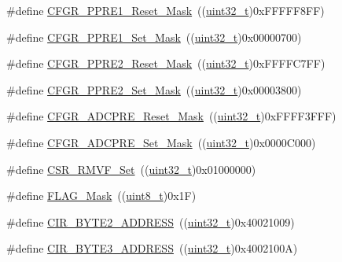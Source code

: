 \begin{DoxyCompactItemize}
\item 
\#define \hyperlink{group___r_c_c___private___defines_gab02d8032f451eb5a1d139007ff57f22e}{C\+F\+G\+R\+\_\+\+P\+P\+R\+E1\+\_\+\+Reset\+\_\+\+Mask}~((\hyperlink{_p_e___types_8h_a33594304e786b158f3fb30289278f5af}{uint32\+\_\+t})0x\+F\+F\+F\+F\+F8\+F\+F)
\item 
\#define \hyperlink{group___r_c_c___private___defines_ga74838e1873c5e4c46eef61a81b1bd2c5}{C\+F\+G\+R\+\_\+\+P\+P\+R\+E1\+\_\+\+Set\+\_\+\+Mask}~((\hyperlink{_p_e___types_8h_a33594304e786b158f3fb30289278f5af}{uint32\+\_\+t})0x00000700)
\item 
\#define \hyperlink{group___r_c_c___private___defines_gab2ee73d52f48cb201e493e381928d1ae}{C\+F\+G\+R\+\_\+\+P\+P\+R\+E2\+\_\+\+Reset\+\_\+\+Mask}~((\hyperlink{_p_e___types_8h_a33594304e786b158f3fb30289278f5af}{uint32\+\_\+t})0x\+F\+F\+F\+F\+C7\+F\+F)
\item 
\#define \hyperlink{group___r_c_c___private___defines_ga63883951c986cf6dc1d6a8775f821af7}{C\+F\+G\+R\+\_\+\+P\+P\+R\+E2\+\_\+\+Set\+\_\+\+Mask}~((\hyperlink{_p_e___types_8h_a33594304e786b158f3fb30289278f5af}{uint32\+\_\+t})0x00003800)
\item 
\#define \hyperlink{group___r_c_c___private___defines_ga12eb3f1b37b9101bf3810374bad68703}{C\+F\+G\+R\+\_\+\+A\+D\+C\+P\+R\+E\+\_\+\+Reset\+\_\+\+Mask}~((\hyperlink{_p_e___types_8h_a33594304e786b158f3fb30289278f5af}{uint32\+\_\+t})0x\+F\+F\+F\+F3\+F\+F\+F)
\item 
\#define \hyperlink{group___r_c_c___private___defines_gaead9b35ba6e98274613c28d24bd228cc}{C\+F\+G\+R\+\_\+\+A\+D\+C\+P\+R\+E\+\_\+\+Set\+\_\+\+Mask}~((\hyperlink{_p_e___types_8h_a33594304e786b158f3fb30289278f5af}{uint32\+\_\+t})0x0000\+C000)
\item 
\#define \hyperlink{group___r_c_c___private___defines_ga415e9d29487f0ef4101a9c6e4f20151f}{C\+S\+R\+\_\+\+R\+M\+V\+F\+\_\+\+Set}~((\hyperlink{_p_e___types_8h_a33594304e786b158f3fb30289278f5af}{uint32\+\_\+t})0x01000000)
\item 
\#define \hyperlink{group___r_c_c___private___defines_ga2be62bf481cd44de9ab604efe5595ff6}{F\+L\+A\+G\+\_\+\+Mask}~((\hyperlink{_p_e___types_8h_aba7bc1797add20fe3efdf37ced1182c5}{uint8\+\_\+t})0x1\+F)
\item 
\#define \hyperlink{group___r_c_c___private___defines_gaab58c3f3f81bf1ab9a14cf3fececd8c4}{C\+I\+R\+\_\+\+B\+Y\+T\+E2\+\_\+\+A\+D\+D\+R\+E\+SS}~((\hyperlink{_p_e___types_8h_a33594304e786b158f3fb30289278f5af}{uint32\+\_\+t})0x40021009)
\item 
\#define \hyperlink{group___r_c_c___private___defines_ga43f47430582c9575970901533e525bb5}{C\+I\+R\+\_\+\+B\+Y\+T\+E3\+\_\+\+A\+D\+D\+R\+E\+SS}~((\hyperlink{_p_e___types_8h_a33594304e786b158f3fb30289278f5af}{uint32\+\_\+t})0x4002100\+A)

\end{DoxyCompactItemize}
